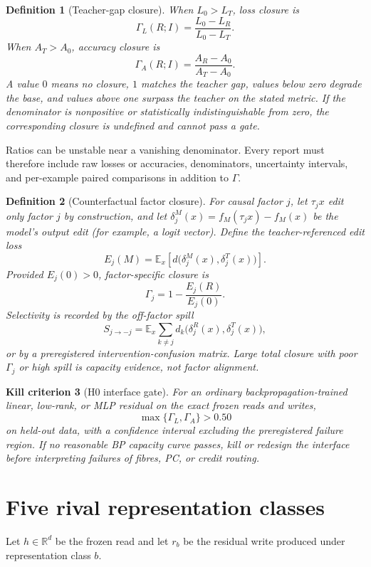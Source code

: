 \documentclass[11pt]{article}
\newtheorem{definition}{Definition}[section]
\newtheorem{criterion}[definition]{Kill criterion}
\newcommand{\R}{\mathbb R}
\begin{document}
\begin{definition}[Teacher-gap closure]
When $L_0>L_T$, loss closure is
\[
 \Gamma_L(R;I)=\frac{L_0-L_R}{L_0-L_T}.
\]
When $A_T>A_0$, accuracy closure is
\[
 \Gamma_A(R;I)=\frac{A_R-A_0}{A_T-A_0}.
\]
A value $0$ means no closure, $1$ matches the teacher gap, values below zero
degrade the base, and values above one surpass the teacher on the stated
metric.  If the denominator is nonpositive or statistically indistinguishable
from zero, the corresponding closure is undefined and cannot pass a gate.
\end{definition}

Ratios can be unstable near a vanishing denominator.  Every report must
therefore include raw losses or accuracies, denominators, uncertainty
intervals, and per-example paired comparisons in addition to $\Gamma$.

\begin{definition}[Counterfactual factor closure]
For causal factor $j$, let $\tau_j x$ edit only factor $j$ by construction,
and let $\delta_j^M(x)=f_M(\tau_jx)-f_M(x)$ be the model's output edit (for
example, a logit vector).  Define the teacher-referenced edit loss
\[
 E_j(M)=\mathbb E_x\!\left[
   d\bigl(\delta_j^M(x),\delta_j^T(x)\bigr)\right].
\]
Provided $E_j(0)>0$, factor-specific closure is
\[
 \Gamma_j=1-\frac{E_j(R)}{E_j(0)}.
\]
Selectivity is recorded by the off-factor spill
\[
 S_{j\rightarrow -j}=
 \mathbb E_x\sum_{k\ne j}
 d_k\bigl(\delta_j^R(x),\delta_j^T(x)\bigr),
\]
or by a preregistered intervention-confusion matrix.  Large total closure with
poor $\Gamma_j$ or high spill is capacity evidence, not factor alignment.
\end{definition}

\begin{criterion}[H0 interface gate]
For an ordinary backpropagation-trained linear, low-rank, or MLP residual on
the exact frozen reads and writes,
\[
 \max\{\Gamma_L,\Gamma_A\}>0.50
\]
on held-out data, with a confidence interval excluding the preregistered
failure region.  If no reasonable BP capacity curve passes, kill or redesign
the interface before interpreting failures of fibres, PC, or credit routing.
\end{criterion}

\section{Five rival representation classes}

Let $h\in\R^d$ be the frozen read and let $r_b$ be the residual write produced
under representation class $b$.
\end{document}
